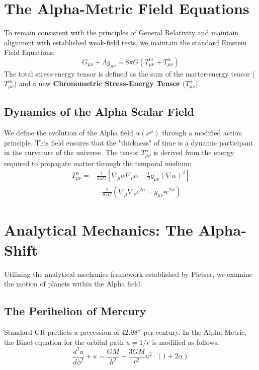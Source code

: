 \documentclass[12pt,a4paper]{article}
\begin{document}
\section{The Alpha-Metric Field Equations}
To remain consistent with the principles of General Relativity and maintain alignment with established weak-field tests, we maintain the standard Einstein Field Equations:
\begin{equation}
G_{\mu\nu} + \Lambda g_{\mu\nu} = 8\pi G ( T_{\mu\nu}^m + T_{\mu\nu}^\alpha )
\end{equation}
The total stress-energy tensor is defined as the sum of the matter-energy tensor ($T_{\mu\nu}^m$) and a new \textbf{Chronometric Stress-Energy Tensor} ($T_{\mu\nu}^\alpha$).

\subsection{Dynamics of the Alpha Scalar Field}
We define the evolution of the Alpha field $\alpha(x^\mu)$ through a modified action principle. This field ensures that the "thickness" of time is a dynamic participant in the curvature of the universe. The tensor $T_{\mu\nu}^\alpha$ is derived from the energy required to propagate matter through the temporal medium:
\begin{equation}
\begin{split}
T_{\mu\nu}^\alpha = & \frac{1}{4\pi G} \left[ \nabla_\mu \alpha \nabla_\nu \alpha - \frac{1}{2} g_{\mu\nu} (\nabla \alpha)^2 \right] \\
& - \frac{1}{8\pi G} \left( \nabla_\mu \nabla_\nu e^{2\alpha} - g_{\mu\nu} \square e^{2\alpha} \right)
\end{split}
\end{equation}

\section{Analytical Mechanics: The Alpha-Shift}
Utilizing the analytical mechanics framework established by Pletser, we examine the motion of planets within the Alpha field.

\subsection{The Perihelion of Mercury}
Standard GR predicts a precession of $42.98''$ per century. In the Alpha-Metric, the Binet equation for the orbital path $u = 1/r$ is modified as follows:
\begin{equation}
\frac{d^2u}{d\phi^2} + u = \frac{GM}{h^2} + \frac{3GM}{c^2} u^2 \cdot (1 + 2\alpha)
\end{equation}
\end{document}
